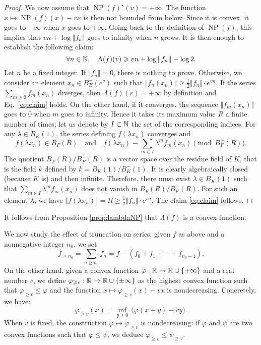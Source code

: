 \documentclass{lms}
\DeclareMathOperator{\NP}{NP}
\begin{document}
\begin{proof}
\smallskip

We now assume that $\NP(f)^\star(v) = +\infty$. The function $x \mapsto 
\NP(f)(x) - vx$ is then not bounded from below. Since it is convex, it 
goes to $-\infty$ when $x$ goes to $+\infty$. Going back to the 
definition of $\NP(f)$, this implies that $v n + \log \Vert f_n \Vert$
goes to infinity when $n$ grows. It is then enough to establish the
following claim:
\begin{equation}
\label{eq:claim}
\forall n \in \mathbb N, \quad 
\Lambda(f)(v) \geqslant v n + \log \Vert f_n \Vert - \log 2.
\end{equation}
Let $n$ be a fixed integer. If $\Vert f_n 
\Vert = 0$, there is nothing to prove. Otherwise, we consider an
element $x_n \in B^-_E(e^v)$ such that $\Vert f_n(x_n) \Vert \geq \frac 
1 2 \Vert f_n \Vert \cdot e^{vn}$. If the series $\sum_{m \geq 0} 
f_m(x_n)$ diverges, then $\Lambda(f)(v) = +\infty$ by definition and 
Eq.~\eqref{eq:claim} holds. On the other hand, if it converges, the
sequence $\Vert f_m(x_n) \Vert$ goes to $0$ when $m$ goes to infinity.
Hence it takes its maximum value $R$ a finite number of times; let us 
denote by $I \subset \mathbb N$ the set of the corresponding indices. For any
$\lambda \in B_K(1)$, the series defining $f(\lambda x_n)$ converges 
and
$$f(\lambda x_n) \in B_F(R)
\quad \text{and} \quad
f(\lambda x_n) \equiv \sum_{m \in I} \lambda^m f_m(x_n)
\pmod {B^-_F(R)}.$$
The quotient $B_F(R) / B^-_F(R)$ is a vector space over the residue
field of $K$, that is the field $k$ defined by $k = B_K(1)/B^-_K(1)$.
It is clearly algebraically closed (because $K$ 
is) and then infinite. Therefore, there must exist $\lambda \in 
B_K(1)$ such that $\sum_{m \in I} \lambda^m f_m(x_n)$ does not vanish
in $B_F(R) / B^-_F(R)$. For such an element $\lambda$, we have $\Vert 
f(\lambda x_n) \Vert = R \geq \frac 1 2 \Vert f_n \Vert \cdot e^{vn}$. 
The claim \eqref{eq:claim} follows.
\end{proof}

\begin{rem}
It follows from Proposition \ref{prop:lambdaNP} that $\Lambda(f)$ is a
convex function.
\end{rem}

We now study the effect of truncation on series: given $f$ as above
and a nonnegative integer $n_0$, we set
\[
f_{\geq n_0} = \sum_{n \geq n_0} f_n = f - (f_0 + f_1 + \cdots +
f_{n_0 - 1}).
\]
On the other hand, given a convex function $\varphi : \mathbb R \to \mathbb R \cup
\{+\infty\}$ and a real number $v$, we define $\varphi_{\geqslant v} : \mathbb R \to 
\mathbb R \cup \{\pm \infty\}$ as the highest convex function such that 
$\varphi_{\geq v} \leq \varphi$ and the function $x \mapsto 
\varphi_{\geq v}(x) - v x$ is nondecreasing. Concretely, we have:
$$\varphi_{\geq v}(x) = \inf_{y \geq 0} \, \big(\varphi(x + y) - v y 
\big).$$
When $v$ is fixed, the construction $\varphi \mapsto \varphi_{\geq v}$
is nondecreasing: if $\varphi$ and $\psi$ are two convex functions such
that $\varphi \leq \psi$, we deduce $\varphi_{\geq v} \leq \psi_{\geq v}$.
\end{document}
